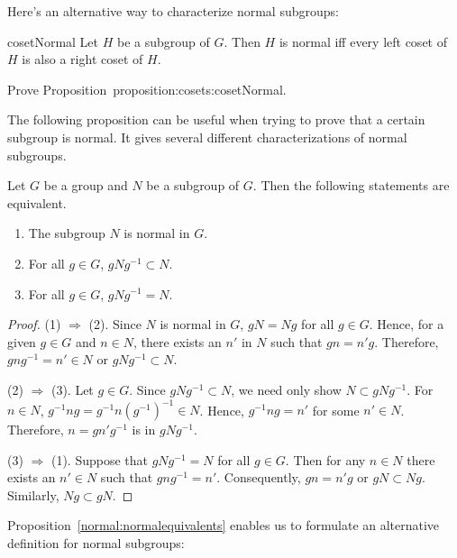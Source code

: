 {Here's an alternative way to characterize normal subgroups:

\begin{prop}{cosetNormal} Let $H$ be a subgroup of $G$. Then $H$ is normal iff every left coset of $H$ is also a right coset of $H$.
\end{prop}
\begin{exercise}{}
Prove Proposition~{proposition:cosets:cosetNormal}.
\end{exercise}

The following proposition can be useful when trying to prove that a certain subgroup is normal.  It gives several different characterizations of normal subgroups.
  
\begin{thm}\label{normal:normalequivalents}
Let $G$ be a group and $N$ be a subgroup of $G$. Then the following
statements are equivalent.
\begin{enumerate}
 
\item
The subgroup $N$ is normal in $G$. 
 
\item
For all $g \in G$, $gNg^{-1} \subset N$. 
 
\item
For all $g \in G$, $gNg^{-1} = N$.
 
\end{enumerate}
\end{thm}
 
 
\begin{proof}
(1) $\Rightarrow$ (2).
Since $N$ is normal in $G$, $gN = Ng$ for all $g \in G$. Hence, for a
given $g \in G$ and $n \in N$, there exists an $n'$ in $N$ such that
$g n = n' g$. Therefore, $gng^{-1} = n' \in N$ or $gNg^{-1} \subset
N$.
 
 
(2)  $\Rightarrow$ (3).  
Let $g \in G$. Since $gNg^{-1} \subset N$, we need only show $N
\subset gNg^{-1}$. For $n \in N$,  $g^{-1}ng=g^{-1}n(g^{-1})^{-1} \in
N$.  Hence, $g^{-1}ng = n'$ for some $n' \in N$. Therefore, $n = g n'
g^{-1}$ is in $g N g^{-1}$.
 
 
(3) $\Rightarrow$ (1).
Suppose that $gNg^{-1} = N$ for all $g \in G$. Then for any $n \in N$
there exists an $n' \in N$ such that $gng^{-1} = n'$.  Consequently,
$gn = n' g$ or $gN \subset Ng$. Similarly, $Ng \subset gN$.
\end{proof}
 
 Proposition~\ref{normal:normalequivalents} enables us to formulate an alternative definition for normal subgroups:  

}
